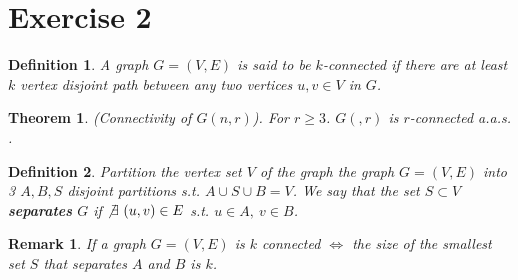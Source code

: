 \documentclass[11pt]{article}
\newtheorem{theorem}{Theorem}
\newtheorem{definition}{Definition}
\newtheorem{remark}{Remark}
\begin{document}
\newpage

\section*{Exercise 2} 

\begin{definition}
    A graph $G=(V,E)$ is said to be $k$-connected if there are at least $k$ vertex disjoint path between any two vertices $u,v\in V$ in $G$.
\end{definition}

\begin{theorem}
    (Connectivity of $G(n,r)$). For $r\geq 3$. $G(,r)$ is $r$-connected a.a.s. .
\end{theorem}

\begin{definition}
    Partition the vertex set $V$ of the graph the graph $G=(V,E)$ into 3 $A,B,S$ disjoint partitions s.t. $A\cup S \cup B=V$. We say that the set $S\subset V$ \textbf{separates} $G$ if $\not \exists ~ (u,v) \in E$ s.t. $u\in A,~v\in B$. 
\end{definition}

\begin{remark}
    If a graph $G=(V,E)$ is $k$ connected $\iff$ the size of the smallest set $S$ that separates $A$ and $B$ is $k$.
\end{remark}
\end{document}
